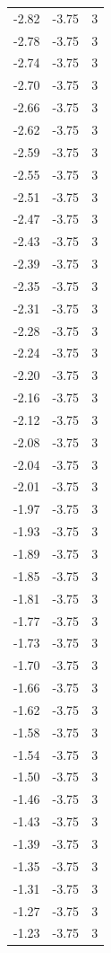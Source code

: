 \begin{longtable}{lrr}
  -2.82 & -3.75 & 3 \\
  -2.78 & -3.75 & 3 \\
  -2.74 & -3.75 & 3 \\
  -2.70 & -3.75 & 3 \\
  -2.66 & -3.75 & 3 \\
  -2.62 & -3.75 & 3 \\
  -2.59 & -3.75 & 3 \\
  -2.55 & -3.75 & 3 \\
  -2.51 & -3.75 & 3 \\
  -2.47 & -3.75 & 3 \\
  -2.43 & -3.75 & 3 \\
  -2.39 & -3.75 & 3 \\
  -2.35 & -3.75 & 3 \\
  -2.31 & -3.75 & 3 \\
  -2.28 & -3.75 & 3 \\
  -2.24 & -3.75 & 3 \\
  -2.20 & -3.75 & 3 \\
  -2.16 & -3.75 & 3 \\
  -2.12 & -3.75 & 3 \\
  -2.08 & -3.75 & 3 \\
  -2.04 & -3.75 & 3 \\
  -2.01 & -3.75 & 3 \\
  -1.97 & -3.75 & 3 \\
  -1.93 & -3.75 & 3 \\
  -1.89 & -3.75 & 3 \\
  -1.85 & -3.75 & 3 \\
  -1.81 & -3.75 & 3 \\
  -1.77 & -3.75 & 3 \\
  -1.73 & -3.75 & 3 \\
  -1.70 & -3.75 & 3 \\
  -1.66 & -3.75 & 3 \\
  -1.62 & -3.75 & 3 \\
  -1.58 & -3.75 & 3 \\
  -1.54 & -3.75 & 3 \\
  -1.50 & -3.75 & 3 \\
  -1.46 & -3.75 & 3 \\
  -1.43 & -3.75 & 3 \\
  -1.39 & -3.75 & 3 \\
  -1.35 & -3.75 & 3 \\
  -1.31 & -3.75 & 3 \\
  -1.27 & -3.75 & 3 \\
  -1.23 & -3.75 & 3 \\

\end{longtable}
